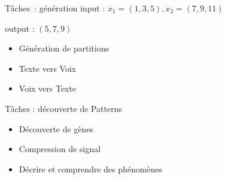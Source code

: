 \begin{frame}{Tâches~: génération}
  input : $x_1=(1,3,5),x_2=(7,9,11)$

  output : $(5,7,9)$

  \begin{itemize}[<+->]
    \item Génération de partitions
    \item Texte vers Voix
    \item Voix vers Texte
  \end{itemize}
\end{frame}

\begin{frame}{Tâches : découverte de Patterns}
  \begin{itemize}[<+->]
    \item Découverte de gènes
    \item Compression de signal
    \item Décrire et comprendre des phénomènes
  \end{itemize}
\end{frame}
